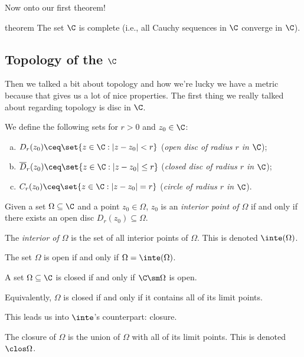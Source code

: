 \documentclass[class=article, crop=false]{standalone}
\begin{document}
Now onto our first theorem!

\begin{result}{theorem}
  The set $\C$ is complete (i.e., all Cauchy sequences in $\C$ converge in $\C$).
\end{result}

\subsection*{Topology of the $\C$}
Then we talked a bit about topology and how we're lucky we have a metric because that gives us a lot of nice properties. The first thing we really talked about regarding topology is disc in $\C$.

\begin{defn}
  We define the following sets for $r > 0$ and $z_0 \in \C$:
    \begin{enumerate}[(a)]
      \item $D_r(z_0) \ceq \set{z \in \C : |z-z_0|< r}$ (\emph{open disc of radius $r$ in $\C$});
      \item $\overline D_r(z_0)\ceq \set{z \in \C : |z-z_0| \leq r}$ (\emph{closed disc of radius $r$ in $\C$});
      \item $C_r(z_0) \ceq \set{z\in \C : |z-z_0| = r}$ (\emph{circle of radius $r$ in $\C$}).
    \end{enumerate}
\end{defn}

\begin{defn}
  Given a set $\Omega\subseteq \C$ and a point $z_0 \in \Omega$, $z_0$ is an \emph{interior point of $\Omega$} if and only if there exists an open disc $D_r(z_0)\subseteq \Omega$.

  The \emph{interior of $\Omega$} is the set of all interior points of $\Omega$. This is denoted $\inte(\Omega)$.

  The set $\Omega$ is open if and only if $\Omega = \inte(\Omega)$.
\end{defn}

\begin{defn}
  A set $\Omega \subseteq \C$ is closed if and only if $\C \sm \Omega$ is open.
\end{defn}
\begin{rem}
  Equivalently, $\Omega$ is closed if and only if it contains all of its limit points.
\end{rem}

This leads us into $\inte$'s counterpart: closure.
\begin{defn}
  The closure of $\Omega$ is the union of $\Omega$ with all of its limit points. This is denoted $\clos \Omega$.
\end{defn}
\end{document}
